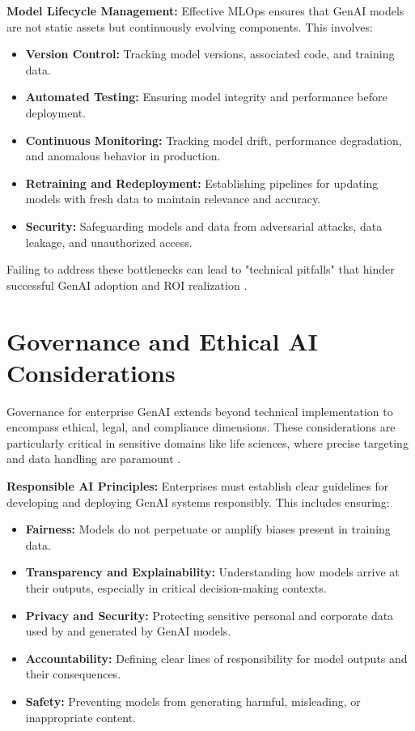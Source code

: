 \documentclass[10pt,journal,compsoc,twocolumn]{IEEEtran}
\begin{document}
\textbf{Model Lifecycle Management:} Effective MLOps ensures that GenAI models are not static assets but continuously evolving components. This involves:
\begin{itemize}
  \item \textbf{Version Control:} Tracking model versions, associated code, and training data.
  \item \textbf{Automated Testing:} Ensuring model integrity and performance before deployment.
  \item \textbf{Continuous Monitoring:} Tracking model drift, performance degradation, and anomalous behavior in production.
  \item \textbf{Retraining and Redeployment:} Establishing pipelines for updating models with fresh data to maintain relevance and accuracy.
  \item \textbf{Security:} Safeguarding models and data from adversarial attacks, data leakage, and unauthorized access.
\end{itemize}

Failing to address these bottlenecks can lead to "technical pitfalls" that hinder successful GenAI adoption and ROI realization \cite{openalex_w4400993506}.


\section{Governance and Ethical AI Considerations}


Governance for enterprise GenAI extends beyond technical implementation to encompass ethical, legal, and compliance dimensions. These considerations are particularly critical in sensitive domains like life sciences, where precise targeting and data handling are paramount \cite{crossref_10_2139_ssrn_6374778}.

\textbf{Responsible AI Principles:} Enterprises must establish clear guidelines for developing and deploying GenAI systems responsibly. This includes ensuring:
\begin{itemize}
  \item \textbf{Fairness:} Models do not perpetuate or amplify biases present in training data.
  \item \textbf{Transparency and Explainability:} Understanding how models arrive at their outputs, especially in critical decision-making contexts.
  \item \textbf{Privacy and Security:} Protecting sensitive personal and corporate data used by and generated by GenAI models.
  \item \textbf{Accountability:} Defining clear lines of responsibility for model outputs and their consequences.
  \item \textbf{Safety:} Preventing models from generating harmful, misleading, or inappropriate content.
\end{itemize}
\end{document}
